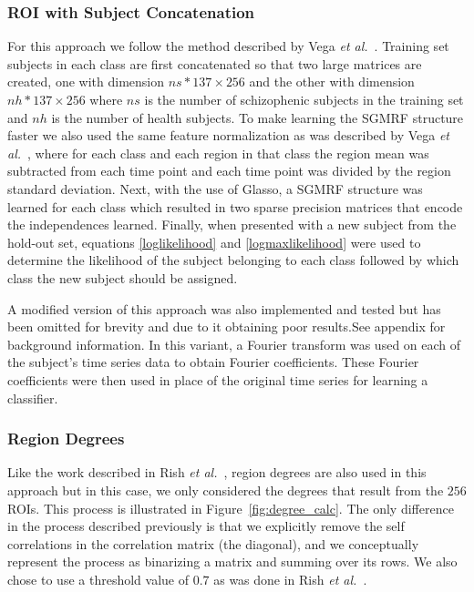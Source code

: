 \documentclass{article} %
\begin{document}
\subsubsection{ROI with Subject Concatenation}

For this approach we follow the method described by Vega \emph{et al.}~\cite{rvega}.
Training set subjects in each class are first concatenated so that two large 
matrices are created, one with dimension $ns * 137 \times 256$ and the other 
with dimension $nh * 137 \times 256$ where $ns$ is the number of schizophenic 
subjects in the training set and $nh$ is the number of health subjects. To
make learning the SGMRF structure faster we also used the same feature 
normalization as was described by Vega \emph{et al.}~\cite{rvega},
where for each class and each region in that class the region mean was 
subtracted from each time point and each time point was divided by the 
region standard deviation. Next, with the use of Glasso, a SGMRF structure was 
learned for each class which resulted in two sparse precision matrices that 
encode the independences learned. Finally, when presented with a new subject 
from the hold-out set, equations \eqref{loglikelihood} and 
\eqref{logmaxlikelihood} were used to determine the likelihood of the subject 
belonging to each class followed by which class the new subject should be 
assigned.

A modified version of this approach was also implemented and tested but has
been omitted for brevity and due to it obtaining poor results.See appendix
for background information. In this variant,
a Fourier transform was used on each of the subject's time series data to 
obtain Fourier coefficients. These Fourier coefficients were then used in 
place of the original time series for learning a classifier.


\subsubsection{Region Degrees}

Like the work described in Rish \emph{et al.}~\cite{rish2009discriminative}, 
region degrees are also used in this approach but in this case, we only 
considered the degrees that result from the $256$ ROIs. This process is 
illustrated in Figure~\ref{fig:degree_calc}. The only difference in the
process described previously is that we explicitly remove the self 
correlations in the correlation matrix (the diagonal), and we conceptually
represent the process as binarizing a matrix and summing over its rows.
We also chose to use a threshold value of $0.7$ as was done in Rish 
\emph{et al.}~\cite{rish2009discriminative}.
\end{document}
